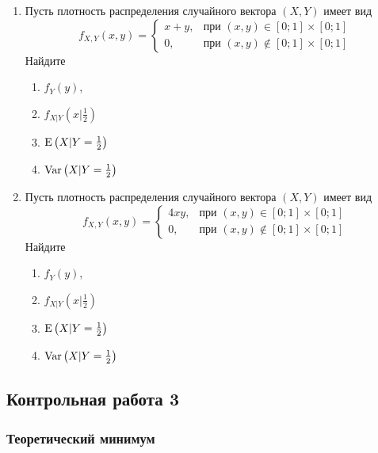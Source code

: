 \begin{enumerate}
\item Пусть плотность распределения случайного вектора $(X,Y)$ имеет вид
\[
f_{X,Y}(x,y) =
\begin{cases}
x+y, & \text{при } (x,y) \in [0;1] \times [0;1] \\
0 , & \text{при } (x,y) \not\in [0;1] \times [0;1]
\end{cases}
\]
Найдите
\begin{enumerate}
\item $f_{Y}(y)$,
\item $f_{X|Y}\left(x|\frac{1}{2}\right)$
\item $\operatorname{E}\left(X|Y = \frac{1}{2}\right)$
\item $\operatorname{Var}\left(X|Y = \frac{1}{2}\right)$
\end{enumerate}

\item Пусть плотность распределения случайного вектора $(X,Y)$ имеет вид
\[
f_{X,Y}(x,y) =
\begin{cases}
4xy, & \text{при } (x,y) \in [0;1] \times [0;1] \\
0 , & \text{при } (x,y) \not\in [0;1] \times [0;1]
\end{cases}
\]
Найдите
\begin{enumerate}
\item $f_{Y}(y)$,
\item $f_{X|Y}\left(x|\frac{1}{2}\right)$
\item $\operatorname{E}\left(X|Y = \frac{1}{2}\right)$
\item $\operatorname{Var}\left(X|Y = \frac{1}{2}\right)$
\end{enumerate}
\end{enumerate}

\newpage
\subsection{Контрольная работа 3}

\subsubsection*{Теоретический минимум}

